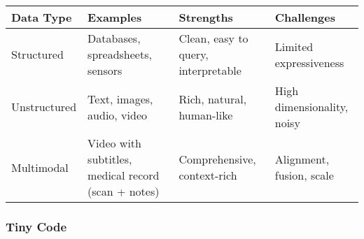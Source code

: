 \documentclass[
  letterpaper,
  DIV=11,
  numbers=noendperiod]{scrreprt}
\begin{document}
\begin{longtable}[]{@{}
  >{\raggedright\arraybackslash}p{}
  >{\raggedright\arraybackslash}p{}
  >{\raggedright\arraybackslash}p{}
  >{\raggedright\arraybackslash}p{}@{}}
\toprule\noalign{}
\begin{minipage}[b]{\linewidth}\raggedright
Data Type
\end{minipage} & \begin{minipage}[b]{\linewidth}\raggedright
Examples
\end{minipage} & \begin{minipage}[b]{\linewidth}\raggedright
Strengths
\end{minipage} & \begin{minipage}[b]{\linewidth}\raggedright
Challenges
\end{minipage} \\
\midrule\noalign{}
\endhead
\bottomrule\noalign{}
\endlastfoot
Structured & Databases, spreadsheets, sensors & Clean, easy to query,
interpretable & Limited expressiveness \\
Unstructured & Text, images, audio, video & Rich, natural, human-like &
High dimensionality, noisy \\
Multimodal & Video with subtitles, medical record (scan + notes) &
Comprehensive, context-rich & Alignment, fusion, scale \\
\end{longtable}

\subsubsection{Tiny Code}\label{tiny-code-71}
\end{document}
